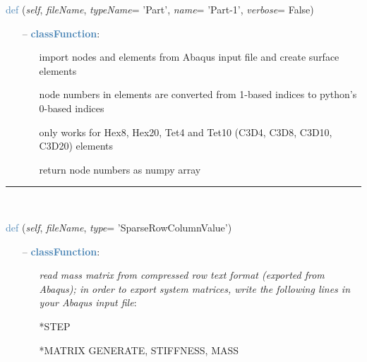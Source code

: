 \begin{itemize}[leftmargin=1.4cm]
\begin{itemize}[leftmargin=1.4cm]
\begin{itemize}[leftmargin=0.5cm]
\begin{itemize}[leftmargin=1.4cm]
\begin{itemize}[leftmargin=1.4cm]
\begin{itemize}[leftmargin=0.5cm]
\begin{flushleft}
\noindent \textcolor{steelblue}{def {\bf {}}}\label{sec:FEM:FEMinterface:ImportFromAbaqusInputFile}
({\it self}, {\it fileName}, {\it typeName}= 'Part', {\it name}= 'Part-1', {\it verbose}= False)
\end{flushleft}
\setlength{\itemindent}{0.7cm}
\begin{itemize}[leftmargin=0.7cm]
  \item[--]  \textcolor{steelblue}{\bf classFunction}: \vspace{-6pt}
  \begin{itemize}[leftmargin=1.2cm]
\setlength{\itemindent}{-0.7cm}
    \item[] import nodes and elements from Abaqus input file and create surface elements
    \item[] node numbers in elements are converted from 1-based indices to python's 0-based indices
    \item[] only works for Hex8, Hex20, Tet4 and Tet10 (C3D4, C3D8, C3D10, C3D20) elements
    \item[] return node numbers as numpy array
  \end{itemize}
\vspace{12pt}\end{itemize}
%
\noindent\rule{8cm}{0.75pt}\vspace{1pt} \\ 
\begin{flushleft}
\noindent \textcolor{steelblue}{def {\bf {}}}\label{sec:FEM:FEMinterface:ReadMassMatrixFromAbaqus}
({\it self}, {\it fileName}, {\it type}= 'SparseRowColumnValue')
\end{flushleft}
\setlength{\itemindent}{0.7cm}
\begin{itemize}[leftmargin=0.7cm]
  \item[--]  \textcolor{steelblue}{\bf classFunction}: \vspace{-6pt}
  \begin{itemize}[leftmargin=1.2cm]
\setlength{\itemindent}{-0.7cm}
    \item[] {\it read mass matrix from compressed row text format (exported from Abaqus); in order to export system matrices, write the following lines in your Abaqus input file}:
    \item[] *STEP
    \item[] *MATRIX GENERATE, STIFFNESS, MASS

\end{itemize}
\end{itemize}
\end{itemize}
\end{itemize}
\end{itemize}
\end{itemize}
\end{itemize}
\end{itemize}
